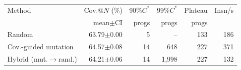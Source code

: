 \begin{tabular}{@{}l r r r r r@{}}\toprule
Method & Cov.@$N$ (\%) & 90\%$C^\ast$ & 99\%$C^\ast$ & Plateau & Insn/s\\
& mean$\pm$CI & progs & progs & progs & \\\midrule
Random & 63.79$\pm$0.00 & 5 & -- & 133 & 186\\
Cov.-guided mutation & 64.57$\pm$0.08 & 14 & 648 & 227 & 371\\
Hybrid (mut.$\rightarrow$rand.) & 64.21$\pm$0.06 & 14 & 1,998 & 227 & 132\\
\bottomrule\end{tabular}